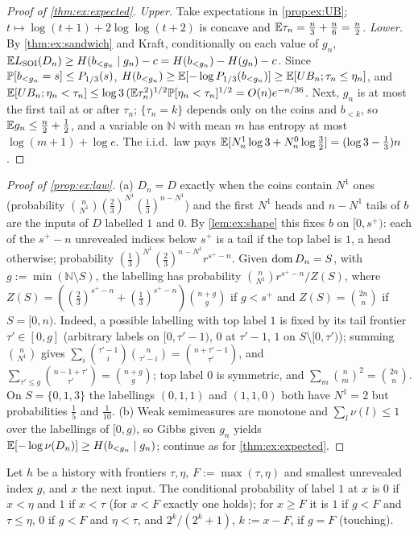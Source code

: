 \begin{proof}[Proof of \cref{thm:ex:expected}]
\emph{Upper.} Take expectations in \cref{prop:ex:UB}; $t\mapsto\log(t+1)+2\log\log(t+2)$ is concave and $\mathbb{E}\tau_n=\frac n3+\frac n6=\frac n2$. \emph{Lower.} By \cref{thm:ex:sandwich} and Kraft, conditionally on each value of $g_n$, $\mathbb{E}L_{\mathrm{SOI}}(D_n)\ge H(b_{<g_n}\mid g_n)-c=H(b_{<g_n})-H(g_n)-c$. Since $\mathbb{P}[b_{<g_n}=s]\le P_{1/3}(s)$, $H(b_{<g_n})\ge\mathbb{E}[-\log P_{1/3}(b_{<g_n})]\ge\mathbb{E}[UB_n;\tau_n\le\eta_n]$, and $\mathbb{E}[UB_n;\eta_n<\tau_n]\le\log3\,(\mathbb{E}\tau_n^2)^{1/2}\mathbb{P}[\eta_n<\tau_n]^{1/2}=O(n)e^{-n/36}$. Next, $g_n$ is at most the first tail at or after $\tau_n$; $\{\tau_n=k\}$ depends only on the coins and $b_{<k}$, so $\mathbb{E} g_n\le\frac n2+\frac12$, and a variable on $\mathbb N$ with mean $m$ has entropy at most $\log(m+1)+\log e$. The i.i.d.\ law pays $\mathbb{E}[N^1_n\log3+N^0_n\log\frac32]=(\log3-\frac13)n$.
\end{proof}

\begin{proof}[Proof of \cref{prop:ex:law}]
(a) $D_n=D$ exactly when the coins contain $N^1$ ones (probability $\binom n{N^1}(\frac23)^{N^1}(\frac13)^{n-N^1}$) and the first $N^1$ heads and $n-N^1$ tails of $b$ are the inputs of $D$ labelled $1$ and $0$. By \cref{lem:ex:shape} this fixes $b$ on $[0,s^+)$: each of the $s^+-n$ unrevealed indices below $s^+$ is a tail if the top label is $1$, a head otherwise; probability $(\frac13)^{N^1}(\frac23)^{n-N^1}r^{s^+-n}$. Given $\operatorname{dom} D_n=S$, with $g:=\min(\mathbb N\setminus S)$, the labelling has probability $\binom n{N^1}r^{s^+-n}/Z(S)$, where $Z(S)=((\frac23)^{s^+-n}+(\frac13)^{s^+-n})\binom{n+g}g$ if $g<s^+$ and $Z(S)=\binom{2n}n$ if $S=[0,n)$. Indeed, a possible labelling with top label $1$ is fixed by its tail frontier $\tau'\in[0,g]$ (arbitrary labels on $[0,\tau'-1)$, $0$ at $\tau'-1$, $1$ on $S\setminus[0,\tau')$); summing $\binom n{N^1}$ gives $\sum_i\binom{\tau'-1}i\binom n{\tau'-i}=\binom{n+\tau'-1}{\tau'}$, and $\sum_{\tau'\le g}\binom{n-1+\tau'}{\tau'}=\binom{n+g}g$; top label $0$ is symmetric, and $\sum_m\binom nm^2=\binom{2n}n$. On $S=\{0,1,3\}$ the labellings $(0,1,1)$ and $(1,1,0)$ both have $N^1=2$ but probabilities $\frac15$ and $\frac1{10}$.
(b) Weak semimeasures are monotone and $\sum_l\nu(l)\le1$ over the labellings of $[0,g)$, so Gibbs given $g_n$ yields $\mathbb{E}[-\log\nu(D_n)]\ge H(b_{<g_n}\mid g_n)$; continue as for \cref{thm:ex:expected}.
\end{proof}

\begin{lemma}\label{lem:ex:pstar}
Let $h$ be a history with frontiers $\tau,\eta$, $F:=\max(\tau,\eta)$ and smallest unrevealed index $g$, and $x$ the next input. The conditional probability of label $1$ at $x$ is $0$ if $x<\eta$ and $1$ if $x<\tau$ (for $x<F$ exactly one holds); for $x\ge F$ it is $1$ if $g<F$ and $\tau\le\eta$, $0$ if $g<F$ and $\eta<\tau$, and $2^k/(2^k+1)$, $k:=x-F$, if $g=F$ (touching).
\end{lemma}

